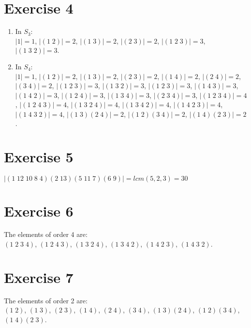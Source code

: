 \documentclass[12pt]{article}
\begin{document}
    \section*{Exercise 4}
    \begin{enumerate}[label=\textbf{\alph*.}]
        \item 
            In $S_3$: \\
            $|1| = 1$,
            $|(1\;2)| = 2$,
            $|(1\;3)| = 2$,
            $|(2\;3)| = 2$,
            $|(1\;2\;3)| = 3$,
            $|(1\;3\;2)| = 3$.
        \item 
            In $S_4$: \\
            $|1| = 1$,
            $|(1\;2)| = 2$,
            $|(1\;3)| = 2$,
            $|(2\;3)| = 2$,
            $|(1\;4)| = 2$,
            $|(2\;4)| = 2$,
            $|(3\;4)| = 2$,
            $|(1\;2\;3)| = 3$,
            $|(1\;3\;2)| = 3$,
            $|(1\;2\;3)| = 3$,
            $|(1\;4\;3)| = 3$,
            $|(1\;4\;2)| = 3$,
            $|(1\;2\;4)| = 3$,
            $|(1\;3\;4)| = 3$,
            $|(2\;3\;4)| = 3$,
            $|(1\;2\;3\;4)| = 4$,
            $|(1\;2\;4\;3)| = 4$,
            $|(1\;3\;2\;4)| = 4$,
            $|(1\;3\;4\;2)| = 4$,
            $|(1\;4\;2\;3)| = 4$,
            $|(1\;4\;3\;2)| = 4$,
            $|(1\;3)(2\;4)| = 2$,
            $|(1\;2)(3\;4)| = 2$,
            $|(1\;4)(2\;3)| = 2$.
    \end{enumerate}   


    \section*{Exercise 5}
    $|(1\;12\;10\;8\;4)(2\;13)(5\;11\;7)(6\;9)| = lcm(5, 2, 3) = 30$


    \section*{Exercise 6}
    The elements of order 4 are: \\
    $(1\;2\;3\;4)$,
    $(1\;2\;4\;3)$,
    $(1\;3\;2\;4)$,
    $(1\;3\;4\;2)$,
    $(1\;4\;2\;3)$,
    $(1\;4\;3\;2)$.


    \section*{Exercise 7}
    The elements of order 2 are: \\
    $(1\;2)$,
    $(1\;3)$,
    $(2\;3)$,
    $(1\;4)$,
    $(2\;4)$,
    $(3\;4)$,
    $(1\;3)(2\;4)$,
    $(1\;2)(3\;4)$,
    $(1\;4)(2\;3)$.
\end{document}
